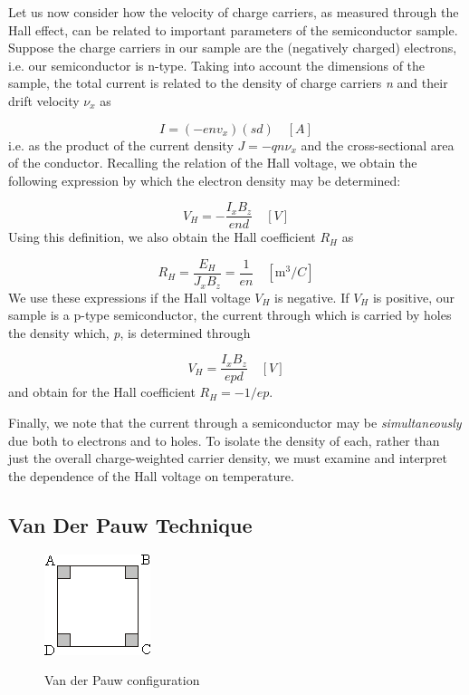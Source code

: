 \documentclass{../lab}
\begin{document}
Let us now consider how the velocity of charge carriers, as measured through the Hall effect, can be related to important parameters of the semiconductor sample. Suppose the charge carriers in our sample are the (negatively charged) electrons, i.e. our semiconductor is n-type. Taking into account the dimensions of the sample, the total current is related to the density of charge carriers \emph{n} and their drift velocity $ \nu_x $ as

\begin{equation}
    I=(-env_x)(sd) \quad [A]
\end{equation}
i.e. as the product of the current density $ J=-qn\nu_x $ and the cross-sectional area of the conductor. Recalling the relation of the Hall voltage, we obtain the following expression by which the electron density may be determined:

\begin{equation}
    V_H=-\frac{I_xB_z}{end} \quad [V]
\end{equation}
Using this definition, we also obtain the Hall coefficient $ R_H $ as

\begin{equation}
    R_H=\frac{E_H}{J_xB_z}=\frac{1}{en} \quad [\text{m}^3/C]
\end{equation}
We use these expressions if the Hall voltage $ V_H $ is negative. If $ V_H $ is positive, our sample is a p-type semiconductor, the current through which is carried by holes the density which, \emph{p}, is determined through

\begin{equation}
    V_H=\frac{I_xB_z}{epd} \quad [V]
\end{equation}
and obtain for the Hall coefficient $R_H = -1/ep$.

Finally, we note that the current through a semiconductor may be \emph{simultaneously} due both to electrons and to holes. To isolate the density of each, rather than just the overall charge-weighted carrier density, we must examine and interpret the dependence of the Hall voltage on temperature.

\subsection{Van Der Pauw Technique}

\begin{figure}[h]
    \centering
    \href{http://experimentationlab.berkeley.edu/sites/default/files/images/SHEimage052.gif}{\includegraphics[width=0.3\linewidth]{images/SHEimage052.png}}
    \caption{Van der Pauw configuration}
    \label{fig:VanDerPauwConfiguration}
\end{figure}
\end{document}

